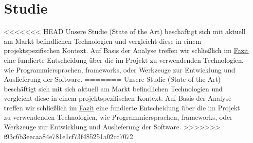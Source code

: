 \chapter{Studie}

<<<<<<< HEAD
Unsere Studie (State of the Art) beschäftigt sich mit aktuell am Markt befindlichen Technologien und vergleicht diese in einem projektspezifischen Kontext. Auf Basis der Analyse treffen wir schließlich im \hyperref[sec:fazit]{Fazit} eine fundierte Entscheidung über die im Projekt zu verwendenden Technologien, wie Programmiersprachen, \gls{framework}s, oder Werkzeuge zur Entwicklung und Auslieferung der Software.
=======
Unsere Studie (State of the Art) beschäftigt sich mit sich aktuell am Markt befindlichen Technologien und vergleicht diese in einem projektspezifischen Kontext. Auf Basis der Analyse treffen wir schließlich im \hyperref[sec:fazit]{Fazit} eine fundierte Entscheidung über die im Projekt zu verwendenden Technologien, wie Programmiersprachen, \gls{framework}s, oder Werkzeuge zur Entwicklung und Auslieferung der Software.
>>>>>>> f93c6b3eecaa84e781e1cf73f485251a02cc7072
